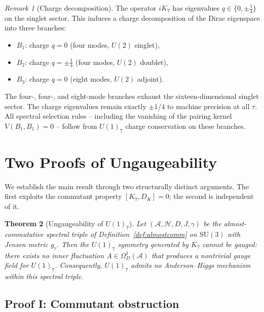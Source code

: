 \documentclass[12pt]{article}
\newtheorem{theorem}{Theorem}
\theoremstyle{definition}
\theoremstyle{remark}
\newtheorem{remark}[theorem]{Remark}
\newcommand{\Hil}{\mathcal{H}}
\newcommand{\Alg}{\mathcal{A}}
\begin{document}
\begin{remark}[Charge decomposition]
The operator $iK_7$ has eigenvalues $q \in \{0, \pm\tfrac{1}{4}\}$ on the singlet sector.  This induces a charge decomposition of the Dirac eigenspace into three branches:
\begin{itemize}
  \item $B_1$: charge $q = 0$ (four modes, $U(2)$ singlet),
  \item $B_2$: charge $q = \pm\tfrac{1}{4}$ (four modes, $U(2)$ doublet),
  \item $B_3$: charge $q = 0$ (eight modes, $U(2)$ adjoint).
\end{itemize}
The four-, four-, and eight-mode branches exhaust the sixteen-dimensional singlet sector.  The charge eigenvalues remain exactly $\pm 1/4$ to machine precision at all $\tau$.  All spectral selection rules -- including the vanishing of the pairing kernel $V(B_1, B_1) = 0$ -- follow from $U(1)_7$ charge conservation on these branches.
\end{remark}


\section{Two Proofs of Ungaugeability}
\label{sec:proofs}

We establish the main result through two structurally distinct arguments.  The first exploits the commutant property $[K_7, D_K] = 0$; the second is independent of it.

\begin{theorem}[Ungaugeability of $U(1)_7$]\label{thm:main}
Let $(\Alg, \Hil, D, J, \gamma)$ be the almost-commutative spectral triple of Definition~\ref{def:almostcomm} on $\mathrm{SU}(3)$ with Jensen metric $g_\tau$.  Then the $U(1)_7$ symmetry generated by $K_7$ cannot be gauged: there exists no inner fluctuation $A \in \Omega^1_D(\Alg)$ that produces a nontrivial gauge field for $U(1)_7$.  Consequently, $U(1)_7$ admits no Anderson--Higgs mechanism within this spectral triple.
\end{theorem}

\subsection{Proof I: Commutant obstruction}
\label{subsec:proof1}
\end{document}
